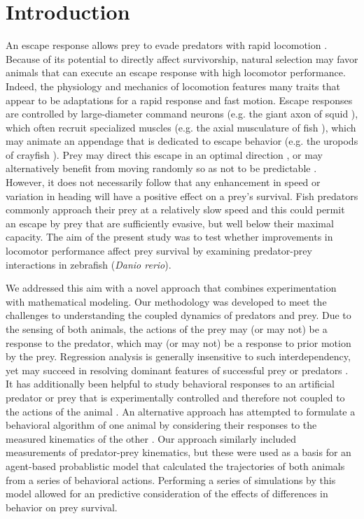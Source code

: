 \documentclass[]{rsos}%
\begin{document}
\section{Introduction}
An escape response allows prey to evade predators with rapid locomotion \cite{Bullock:1984gd}.
Because of its potential to directly affect survivorship, natural selection may favor animals that can execute an escape response with high locomotor performance.
Indeed, the physiology and mechanics of locomotion features many traits that appear to be adaptations for a rapid response and fast motion.
Escape responses are controlled by large-diameter command neurons (e.g. the giant axon of squid \cite{YOUNG:1938vi}), which often recruit specialized muscles (e.g. the axial musculature of fish \cite{Eaton:1975ux}), which may animate an appendage that is dedicated to escape behavior (e.g. the uropods of crayfish \cite{Johnson:1926cl}).
Prey may direct this escape in an optimal direction \cite{Weihs:1984tb}, or may alternatively benefit from moving randomly so as not to be predictable \cite{Humphries:1970hy,Howland:1974ud}.
However, it does not necessarily follow that any enhancement in speed or variation in heading will have a positive effect on a prey's survival.
Fish predators commonly approach their prey at a relatively slow speed \cite{Webb:1984jz,Higham:2007go} and this could permit an escape by prey that are sufficiently evasive, but well below their maximal capacity. 
The aim of the present study was to test whether improvements in locomotor performance affect prey survival by examining predator-prey interactions in zebrafish (\textit{Danio rerio}).

We addressed this aim with a novel approach that combines experimentation with mathematical modeling.
Our methodology was developed to meet the challenges to understanding the coupled dynamics of predators and prey.
Due to the sensing of both animals, the actions of the prey may (or may not) be a response to the predator, which may (or may not) be a response to prior motion by the prey. 
Regression analysis is generally insensitive to such interdependency, yet may succeed in resolving dominant features of successful prey \cite{Walker:2005vn} or predators \cite{Wainwright:2001ufa}.
It has additionally been helpful to study behavioral responses to an artificial predator or prey that is experimentally controlled and therefore not coupled to the actions of the animal \cite{Gabbiani:1999wz,Stewart:2014cma,Heuch:2007kk,Wainwright:2001ufa,Shifferman:2004fs}.
An alternative approach has attempted to formulate a behavioral algorithm of one animal by considering their responses to the measured kinematics of the other \cite{Ghose:2006dk}. 
Our approach similarly included measurements of predator-prey kinematics, but these were used as a basis for an agent-based probablistic model that calculated the trajectories of both animals from a series of behavioral actions. 
Performing a series of simulations by this model allowed for an predictive consideration of the effects of differences in behavior on prey survival.
\end{document}
